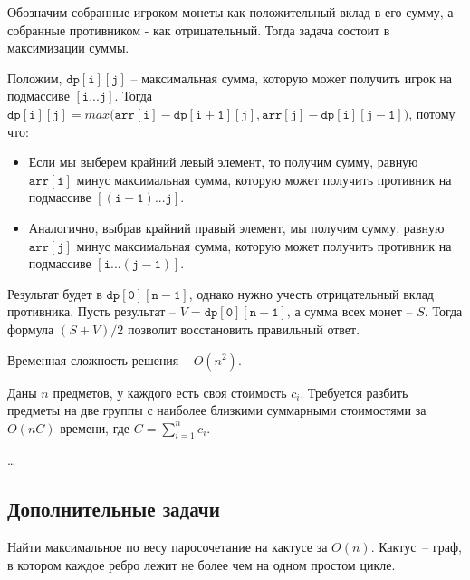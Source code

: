 \begin{solution}
    Обозначим собранные игроком монеты как положительный вклад в его сумму, а собранные противником - как отрицательный.
    Тогда задача состоит в максимизации суммы.

    Положим, $\mathtt{dp[i][j]}$ -- максимальная сумма, которую может получить игрок на подмассиве $\mathtt{[i...j]}$.
    Тогда $\mathtt{dp[i][j]} = max(\mathtt{arr[i]} - \mathtt{dp[i + 1][j]}, \mathtt{arr[j]} - \mathtt{dp[i][j - 1])}$,
    потому что:

    \begin{itemize}
        \item Если мы выберем крайний левый элемент, то получим сумму, равную $\mathtt{arr[i]}$ минус максимальная сумма,
            которую может получить противник на подмассиве $\mathtt{[(i + 1)...j]}$.
        \item Аналогично, выбрав крайний правый элемент, мы получим сумму, равную $\mathtt{arr[j]}$ минус максимальная
            сумма, которую может получить противник на подмассиве $\mathtt{[i...(j - 1)]}$.
    \end{itemize}

    Результат будет в $\mathtt{dp[0][n - 1]}$, однако нужно учесть отрицательный вклад противника. Пусть результат -- $V =
    \mathtt{dp[0][n - 1]}$, а сумма всех монет -- $S$. Тогда формула $(S + V) / 2$ позволит восстановить правильный ответ.

    Временная сложность решения -- $O(n^2)$.

    
\end{solution}


\begin{problem}
    Даны $n$ предметов, у каждого есть своя стоимость $c_i$. Требуется разбить предметы на две группы с наиболее близкими суммарными стоимостями за $O(nC)$ времени, где $C = \sum\limits_{i = 1}^n c_i$.
\end{problem}

\begin{solution}
    \dots
\end{solution}


\subsection*{Дополнительные задачи}

\begin{problem}
    Найти максимальное по весу паросочетание на кактусе за
    $O(n)$. Кактус~-- граф, в котором каждое ребро лежит не более чем на одном простом цикле.
\end{problem}

